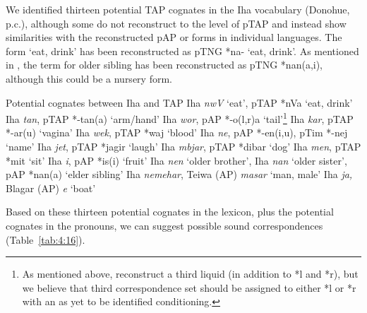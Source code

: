 We identified thirteen potential TAP cognates in the Iha vocabulary (Donohue, p.c.), although some do not reconstruct to the level of pTAP and instead show similarities with the reconstructed pAP or forms in individual languages. The form `eat, drink' has been reconstructed as pTNG *na- `eat, drink'. As mentioned in , the term for older sibling has been reconstructed as pTNG *nan(a,i), although this could be a nursery form.

\ea%
\label{ex:4:60}
\upshape 
  Potential cognates between Iha and TAP  
  \ea 
  \upshape  Iha \textit{nwV} `eat', pTAP *nVa `eat, drink'
  \ex \upshape  Iha \textit{tan}, pTAP *-tan(a) `arm/hand'
  \ex \upshape  Iha \textit{wor}, pAP *-o(l,r)a `tail'\footnote{As mentioned above,  \citet{SchapperEtAlTVtimor} reconstruct a third liquid (in addition to *l and *r), but we believe that third correspondence set should be assigned to either *l or *r with an as yet to be identified conditioning. }
  \ex \upshape  Iha \textit{kar}, pTAP *-ar(u) `vagina'
  \ex \upshape  Iha \textit{wek}, pTAP *waj `blood'
  \ex \upshape  Iha \textit{ne}, pAP *-en(i,u), pTim *-nej `name'
  \ex \upshape  Iha \textit{jet}, pTAP *jagir `laugh'
  \ex \upshape Iha \textit{mbjar}, pTAP *dibar `dog'
  \ex \upshape Iha \textit{m{\pharfric}en}, pTAP *mit `sit'
  \ex \upshape Iha \textit{i{\pharfric}}, pAP *is(i) `fruit'
  \ex \upshape Iha \textit{nen }`older brother', Iha \textit{nan} `older sister', pAP *nan(a) `elder sibling'
  \ex \upshape Iha \textit{nemehar}, Teiwa (AP) \textit{masar} `man, male'
  \ex \upshape Iha \textit{ja, }Blagar (AP) \textit{{\textdyoghlig}}\textit{e} `boat'
  \z
\z
 

Based on these thirteen potential cognates in the lexicon, plus the potential cognates in the pronouns, we can suggest possible sound correspondences (Table~\ref{tab:4:16}). 


